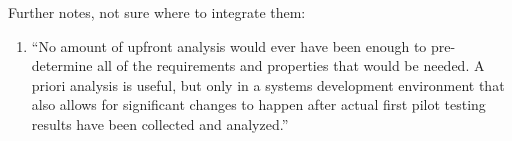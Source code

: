 	Further notes, not sure where to integrate them:
	\begin{enumerate}
	\item ``No amount of upfront analysis would ever have been enough to pre- determine all of the requirements and properties that would be needed. A priori analysis is useful, but only in a systems development environment that also allows for significant changes to happen after actual first pilot testing results have been collected and analyzed.'' \cite{russell2004use}
	\end{enumerate}





